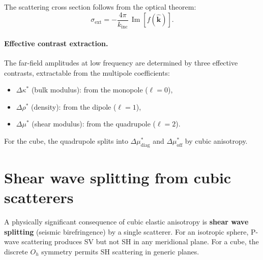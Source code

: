 \documentclass[11pt,a4paper]{article}
\newcommand{\D}{\Delta}
\newcommand{\Oh}{O_h}
\theoremstyle{plain}
\theoremstyle{definition}
\theoremstyle{remark}
\begin{document}
The scattering cross section follows from the optical theorem:
\begin{equation}
  \sigma_{\mathrm{ext}}
  = -\frac{4\pi}{k_{\mathrm{inc}}}\,
    \operatorname{Im}[f(\hat{\bm{k}})].
  \label{eq:optical-theorem}
\end{equation}

\paragraph{Effective contrast extraction.}
The far-field amplitudes at low frequency are determined by three
effective contrasts, extractable from the multipole coefficients:
\begin{itemize}[nosep]
  \item $\D\kappa^*$ (bulk modulus): from the monopole ($\ell = 0$),
  \item $\D\rho^*$ (density): from the dipole ($\ell = 1$),
  \item $\D\mu^*$ (shear modulus): from the quadrupole ($\ell = 2$).
\end{itemize}
For the cube, the quadrupole splits into $\D\mu^*_\mathrm{diag}$ and
$\D\mu^*_\mathrm{off}$ by cubic anisotropy.


\section{Shear wave splitting from cubic scatterers}
\label{sec:shear-wave-splitting}

A physically significant consequence of cubic elastic anisotropy is
\textbf{shear wave splitting} (seismic birefringence) by a single
scatterer.  For an isotropic sphere, P-wave scattering produces SV but
not SH in any meridional plane.  For a cube, the discrete $\Oh$
symmetry permits SH scattering in generic planes.
\end{document}
